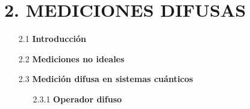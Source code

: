 \documentclass[12pt,oneside]{book}\raggedbottom{} %
\begin{document}
\begin{sloppypar}
{{\begin{itemize}
\begin{itemize}
\end{itemize}
\end{itemize}

\section*{2. MEDICIONES DIFUSAS}
  \begin{itemize}
    \item[2.1]\textbf{Introducción}



  \item[2.2]\textbf{Mediciones no ideales}  


  \item[2.3]\textbf{{Medición difusa en sistemas cuánticos}}  



\begin{itemize}
  \item[2.3.1]\textbf{{Operador difuso}}
  


\end{itemize}
\end{itemize}}}
\end{sloppypar}
\end{document}

